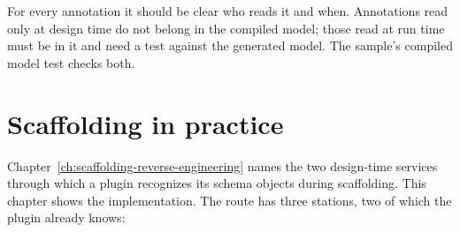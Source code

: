 \begin{tip}
  For every annotation it should be clear who reads it and when. Annotations read only at
  design time do not belong in the compiled model; those read at run time must be in it and
  need a test against the generated model. The sample's compiled model test checks both.
\end{tip}

\chapter{Scaffolding in practice}\label{ch:scaffolding-in-practice}

Chapter~\ref{ch:scaffolding-reverse-engineering} names the two design-time services through
which a plugin recognizes its schema objects during scaffolding. This chapter shows the
implementation. The route has three stations, two of which the plugin already knows:

\begin{flowdiagram}
\end{flowdiagram}

